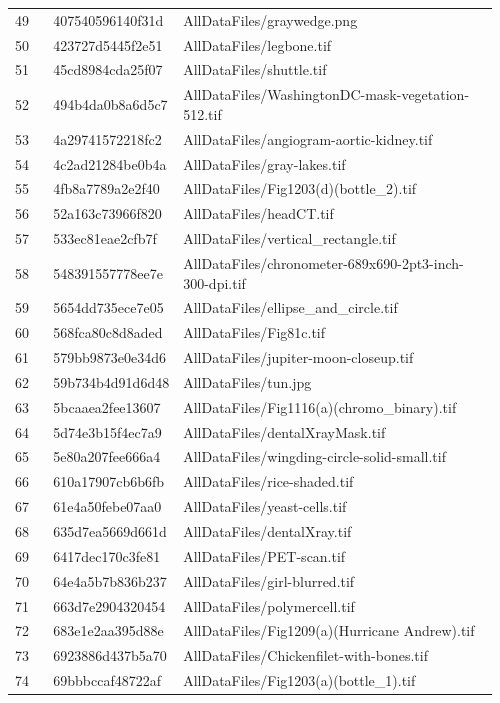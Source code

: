\documentclass[11pt]{article}
\begin{document}
\begin{longtable}{p{0.08\linewidth}p{0.22\linewidth}p{0.66\linewidth}}
49 & 407540596140f31d & AllDataFiles/graywedge.png \\
50 & 423727d5445f2e51 & AllDataFiles/legbone.tif \\
51 & 45cd8984cda25f07 & AllDataFiles/shuttle.tif \\
52 & 494b4da0b8a6d5c7 & AllDataFiles/WashingtonDC-mask-vegetation-512.tif \\
53 & 4a29741572218fc2 & AllDataFiles/angiogram-aortic-kidney.tif \\
54 & 4c2ad21284be0b4a & AllDataFiles/gray-lakes.tif \\
55 & 4fb8a7789a2e2f40 & AllDataFiles/Fig1203(d)(bottle\_2).tif \\
56 & 52a163c73966f820 & AllDataFiles/headCT.tif \\
57 & 533ec81eae2cfb7f & AllDataFiles/vertical\_rectangle.tif \\
58 & 548391557778ee7e & AllDataFiles/chronometer-689x690-2pt3-inch-300-dpi.tif \\
59 & 5654dd735ece7e05 & AllDataFiles/ellipse\_and\_circle.tif \\
60 & 568fca80c8d8aded & AllDataFiles/Fig81c.tif \\
61 & 579bb9873e0e34d6 & AllDataFiles/jupiter-moon-closeup.tif \\
62 & 59b734b4d91d6d48 & AllDataFiles/tun.jpg \\
63 & 5bcaaea2fee13607 & AllDataFiles/Fig1116(a)(chromo\_binary).tif \\
64 & 5d74e3b15f4ec7a9 & AllDataFiles/dentalXrayMask.tif \\
65 & 5e80a207fee666a4 & AllDataFiles/wingding-circle-solid-small.tif \\
66 & 610a17907cb6b6fb & AllDataFiles/rice-shaded.tif \\
67 & 61e4a50febe07aa0 & AllDataFiles/yeast-cells.tif \\
68 & 635d7ea5669d661d & AllDataFiles/dentalXray.tif \\
69 & 6417dec170c3fe81 & AllDataFiles/PET-scan.tif \\
70 & 64e4a5b7b836b237 & AllDataFiles/girl-blurred.tif \\
71 & 663d7e2904320454 & AllDataFiles/polymercell.tif \\
72 & 683e1e2aa395d88e & AllDataFiles/Fig1209(a)(Hurricane Andrew).tif \\
73 & 6923886d437b5a70 & AllDataFiles/Chickenfilet-with-bones.tif \\
74 & 69bbbccaf48722af & AllDataFiles/Fig1203(a)(bottle\_1).tif \\

\end{longtable}
\end{document}
